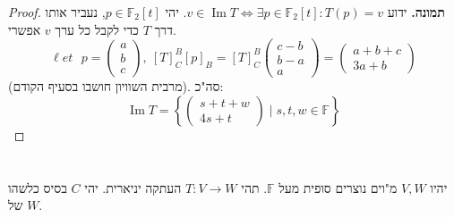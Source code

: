 \documentclass[]{article}
\newcommand\set   {\ell et \text{ }}
\DeclareMathOperator\Img   {Im}
\newcommand\F         {\mathbb{F}}
\newcommand\co        {\colon}
\newcommand\pms[1]    {\begin{pmatrix}
		#1
\end{pmatrix}}
\newcommand\ccb[1]    {\left \{ #1 \right \}}
\begin{document}
\begin{enumerate}[A)]
\begin{proof}
			\textbf{תמונה. }ידוע $v \in \Img T \iff \exists p \in \F_2[t] \co T(p) = v$. יהי $p\in \F_2[t]$, נעביר אותו דרך $T$ כדי לקבל כל ערך $v$ אפשרי. 
			\[ \set p = \!\pms{a \\ b \\ c}\!, \ [T]^B_C[p]_B = [T]^B_C\pms{c - b \\ b - a \\ a} = \pms{a + b + c \\ 3a + b} \]
			(מרבית השוויון חושבו בסעיף הקודם). סה"כ: 
			\[ \Img T = \ccb{\pms{s + t + w\\ 4s + t} \mid s, t, w \in \F} \]
		\end{proof}
	\end{enumerate}
	
	\section{}
	יהיו $V, W$ מ"וים נוצרים סופית מעל $\F$. תהי $T \co V \to W$ העתקה יניארית. יהי $C$ בסיס כלשהו של $W$. 
\end{document}
